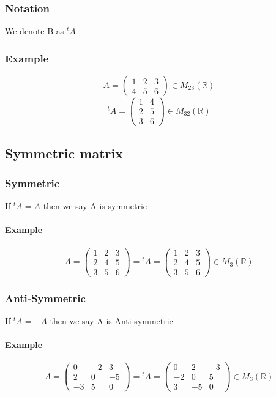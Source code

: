 \documentclass[notitlepage]{math}
\begin{document}
    \subsubsection{Notation}
    We denote B as ${}^t \! A$
    \subsubsection{Example}
    
    \[ A = \begin{pmatrix}
        1 & 2 & 3 \\
        4 & 5 & 6
    \end{pmatrix} \in M_{23}(\mathbb{R})\]
    \[ {}^t \! A = \begin{pmatrix}
        1 & 4 \\
        2 & 5 \\
        3 & 6
    \end{pmatrix} \in M_{32}(\mathbb{R})\]


\subsection{Symmetric matrix}
    \subsubsection{Symmetric}
        If $ {}^t \! A = A $ then we say A is symmetric
        \paragraph{Example}
        \[ A = \begin{pmatrix}
            1 & 2 & 3 \\
            2 & 4 & 5 \\
            3 & 5 & 6
        \end{pmatrix} = {}^t \! A = 
        \begin{pmatrix}
            1 & 2 & 3 \\
            2 & 4 & 5 \\
            3 & 5 & 6
        \end{pmatrix}
            \in M_{3}(\mathbb{R})\]
    \subsubsection{Anti-Symmetric}
        If $ {}^t \! A = -A $ then we say A is Anti-symmetric
        \paragraph{Example}
        \[ A = \begin{pmatrix}
            0 & -2 & 3 \\
            2 & 0 & -5 \\
            -3 & 5 & 0
        \end{pmatrix} = {}^t \! A = 
        \begin{pmatrix}
            0 & 2 & -3 \\
            -2 & 0 & 5 \\
            3 & -5 & 0
        \end{pmatrix}
            \in M_{3}(\mathbb{R})\]
\end{document}
